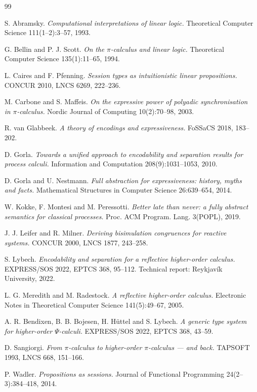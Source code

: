 \documentclass[11pt]{article}
\theoremstyle{definition}
\theoremstyle{plain}
\theoremstyle{remark}
\begin{document}
\begin{thebibliography}{99}

 S. Abramsky.
\emph{Computational interpretations of linear logic.}
Theoretical Computer Science 111(1--2):3--57, 1993.

 G. Bellin and P. J. Scott.
\emph{On the $\pi$-calculus and linear logic.}
Theoretical Computer Science 135(1):11--65, 1994.

 L. Caires and F. Pfenning.
\emph{Session types as intuitionistic linear propositions.}
CONCUR 2010, LNCS 6269, 222--236.

 M. Carbone and S. Maffeis.
\emph{On the expressive power of polyadic synchronisation in $\pi$-calculus.}
Nordic Journal of Computing 10(2):70--98, 2003.

 R. van Glabbeek.
\emph{A theory of encodings and expressiveness.}
FoSSaCS 2018, 183--202.

 D. Gorla.
\emph{Towards a unified approach to encodability and separation results
for process calculi.}
Information and Computation 208(9):1031--1053, 2010.

 D. Gorla and U. Nestmann.
\emph{Full abstraction for expressiveness: history, myths and facts.}
Mathematical Structures in Computer Science 26:639--654, 2014.

 W. Kokke, F. Montesi and M. Peressotti.
\emph{Better late than never: a fully abstract semantics for classical
processes.}
Proc. ACM Program. Lang. 3(POPL), 2019.

 J. J. Leifer and R. Milner.
\emph{Deriving bisimulation congruences for reactive systems.}
CONCUR 2000, LNCS 1877, 243--258.

 S. Lybech.
\emph{Encodability and separation for a reflective higher-order calculus.}
EXPRESS/SOS 2022, EPTCS 368, 95--112.
Technical report: Reykjav\'ik University, 2022.

 L. G. Meredith and M. Radestock.
\emph{A reflective higher-order calculus.}
Electronic Notes in Theoretical Computer Science 141(5):49--67, 2005.

 A. R. Bendixen, B. B. Bojesen, H. H\"uttel and S. Lybech.
\emph{A generic type system for higher-order $\Psi$-calculi.}
EXPRESS/SOS 2022, EPTCS 368, 43--59.

 D. Sangiorgi.
\emph{From $\pi$-calculus to higher-order $\pi$-calculus --- and back.}
TAPSOFT 1993, LNCS 668, 151--166.

 P. Wadler.
\emph{Propositions as sessions.}
Journal of Functional Programming 24(2--3):384--418, 2014.

\end{thebibliography}
\end{document}

